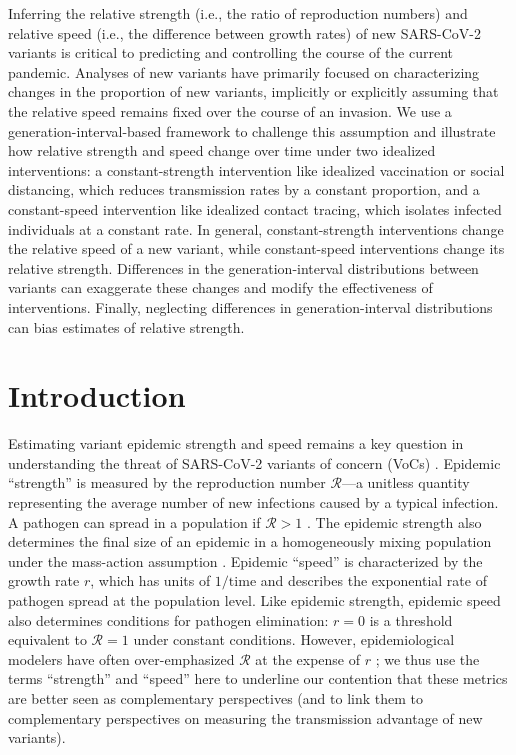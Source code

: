 \documentclass[12pt]{article}
\newcommand{\RR}{\ensuremath{{\mathcal R}}\xspace}
\begin{document}
Inferring the relative strength (i.e., the ratio of reproduction numbers) and relative speed (i.e., the difference between growth rates) of new SARS-CoV-2 variants is critical to predicting and controlling the course of the current pandemic.
Analyses of new variants have primarily focused on characterizing changes in the proportion of new variants, implicitly or explicitly assuming that the relative speed remains fixed over the course of an invasion.
We use a generation-interval-based framework to challenge this assumption and illustrate how relative strength and speed change over time under two idealized interventions:
a constant-strength intervention like idealized vaccination or social distancing, which reduces transmission rates by a constant proportion, and a constant-speed intervention like idealized contact tracing, which isolates infected individuals at a constant rate.
In general, constant-strength interventions change the relative speed of a new variant, while constant-speed interventions change its relative strength.
Differences in the generation-interval distributions between variants can exaggerate these changes and modify the effectiveness of interventions.
Finally, neglecting differences in generation-interval distributions can bias estimates of relative strength. 

\section{Introduction}

Estimating variant epidemic strength and speed remains a key question in understanding the threat of SARS-CoV-2 variants of concern (VoCs) \cite{switzerland2021variant,davies2021estimated,di2021impact,graham2021changes,leung2021early,volz2021transmission,zhao2021,campbell2021increased}.
Epidemic ``strength'' is measured by the reproduction number $\RR$---a unitless quantity representing the average number of new infections caused by a typical infection. 
A pathogen can spread in a population if $\RR>1$ \citep{diekmann1990definition}.
The epidemic strength also determines the final size of an epidemic in a homogeneously mixing population under the mass-action assumption \citep{anderson1991infectious}.
Epidemic ``speed'' is characterized by the growth rate $r$, which has units of $1/\mathrm{time}$ and describes the exponential rate of pathogen spread at the population level.
Like epidemic strength, epidemic speed also determines conditions for pathogen elimination: $r=0$ is a threshold equivalent to $\RR=1$ under constant conditions.
However, epidemiological modelers have often over-emphasized $\RR$ at the expense of $r$ \citep{doi:10.1098/rspb.2020.1556};
we thus use the terms ``strength'' and ``speed''  here to underline our contention that these metrics are better seen as complementary perspectives (and to link them to complementary perspectives on measuring the transmission advantage of new variants).
\end{document}

